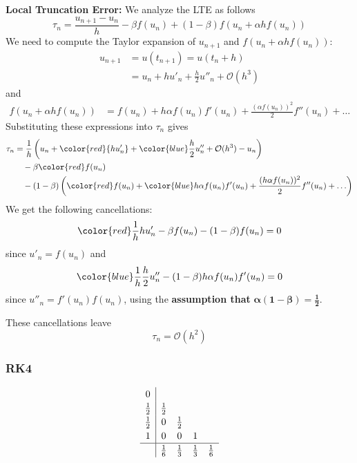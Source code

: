 \documentclass[12pt]{article}
\theoremstyle{definition}
\theoremstyle{definition}
\begin{document}
\textbf{Local Truncation Error:} We analyze the LTE as follows
\begin{equation}
	\tau_n = \frac{u_{n+1}-u_n}{h} - \beta f(u_n) + (1-\beta)f(u_n + \alpha h f(u_n))
\end{equation}
We need to compute the Taylor expansion of $u_{n+1}$ and $f(u_n + \alpha h f(u_n))$:
\begin{align*}
	u_{n+1} &= u(t_{n+1}) = u(t_n + h) \\
	&=  u_n + hu'_n + \frac{h}{2}u''_n + \mathcal{O}(h^3)
\end{align*}
and
\begin{align*}
	f(u_n + \alpha h f(u_n)) &= f(u_n) + h\alpha f(u_n)f'(u_n) + \frac{(\alpha f(u_n))^2}{2}f''(u_n) + \ldots 
\end{align*}
Substituting these expressions into $\tau_n$ gives
\begin{align*}
	\tau_n &= \frac{1}{h}\left(u_n + {\color{red}{hu'_n}} +  {\color{blue}\frac{h}{2}u''_n} + \mathcal{O}(h^3) - u_n \right) \\
	&\quad -\beta{\color{red}f(u_n)} \\
	&\quad - (1-\beta)\left({\color{red}f(u_n)} + {\color{blue}h\alpha f(u_n)f'(u_n)} + \frac{(h\alpha f(u_n))^2}{2}f''(u_n) + \ldots \right)
\end{align*}
We get the following cancellations:
\begin{equation}
	{\color{red}\frac{1}{h} h u'_n - \beta f(u_n) - (1-\beta)f(u_n) = 0}
\end{equation}
since $u'_n=f(u_n)$ and
\begin{equation}
	 {\color{blue}\frac{1}{h}\frac{h}{2}u''_n - (1-\beta)h\alpha f(u_n)f'(u_n) = 0}
\end{equation}
since $u''_n=f'(u_n)f(u_n)$, using the \textbf{assumption that} $\bm{\alpha(1-\beta) = \frac{1}{2}}$. 

These cancellations leave
\begin{equation}
	\tau_n = \mathcal{O}(h^2)
\end{equation}
\subsubsection{RK4}

\[
\renewcommand\arraystretch{1.2}
\begin{array}
{c|cccc}
0\\
\frac{1}{2} & \frac{1}{2}\\
\frac{1}{2} &0 &\frac{1}{2} \\
1& 0& 0& 1\\
\hline
& \frac{1}{6} &\frac{1}{3} &\frac{1}{3} &\frac{1}{6} 
\end{array}
\]
\end{document}
